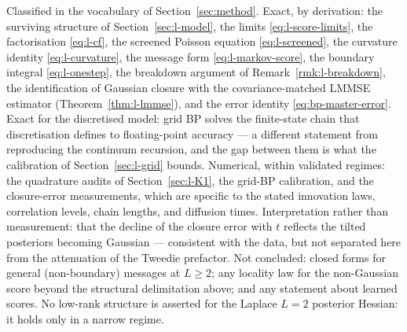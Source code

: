 Classified in the vocabulary of Section~\ref{sec:method}.
Exact, by derivation: the surviving structure of Section~\ref{sec:l-model}, the limits
\eqref{eq:l-score-limits}, the factorisation \eqref{eq:l-cf}, the
screened Poisson equation \eqref{eq:l-screened}, the curvature identity
\eqref{eq:l-curvature}, the message form \eqref{eq:l-markov-score}, the
boundary integral \eqref{eq:l-onestep}, the breakdown argument of
Remark~\ref{rmk:l-breakdown}, the identification of Gaussian closure with the
covariance-matched LMMSE estimator (Theorem~\ref{thm:l-lmmse}), and the error
identity \eqref{eq:bp-master-error}. Exact for the discretised model: grid BP
solves the finite-state chain that discretisation defines to floating-point
accuracy --- a different statement from reproducing the continuum recursion,
and the gap between them is what the calibration of
Section~\ref{sec:l-grid} bounds. Numerical, within validated regimes: the
quadrature audits of Section~\ref{sec:l-K1}, the grid-BP calibration, and
the closure-error measurements, which are specific to the stated
innovation laws, correlation levels, chain lengths, and diffusion times.
Interpretation rather than measurement: that the decline of the closure error
with $t$ reflects the tilted posteriors becoming Gaussian --- consistent with
the data, but not separated here from the attenuation of the Tweedie
prefactor.
Not concluded: closed forms for general (non-boundary) messages at
$L \geq 2$; any locality law for the non-Gaussian score beyond the
structural delimitation above; and any statement about learned scores. No
low-rank structure is asserted for the Laplace $L = 2$ posterior Hessian: it
holds only in a narrow regime.
